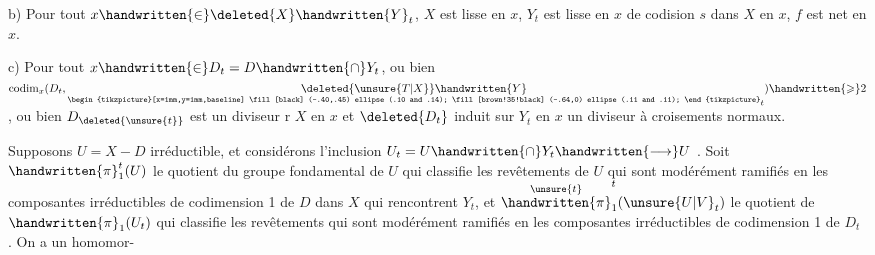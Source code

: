 b) Pour tout $x\handwritten{\in}\deleted{X}\handwritten{Y}_t$, $X$ est lisse en $x$, $Y_t$ est lisse en $x$\handwritten{,} de codision $s$ dans $X$ en $x$, $f$ est net en $x$.

c) Pour tout $x\handwritten{\in}D_t=D\handwritten{\cap}Y_t$, o\deleted{\unsure{\`{}}}u  bien $\operatorname{codim}_x(D_t,\underset{\begin{tikzpicture}[x=1mm,y=1mm,baseline]
\fill[black] (-.40,.45) ellipse (.10 and .14);
\fill[brown!35!black] (-.64,0) ellipse (.11 and .11);
\end{tikzpicture}}{\deleted{\unsure{T|X}}\handwritten{Y}}_t)\handwritten{\geqslant}2$, ou bien $D_{\deleted{\unsure{t}}}$ est un diviseur r $X$ en $x$ et $\deleted{D_t}$ induit sur $Y_t$ en $x$ un diviseur à croisements normaux.

Supposons $U=X-D$ irréductible, et considérons l'inclusion $U_t=U\handwritten{\cap}Y_t\handwritten{\longrightarrow}U$ .  Soit $\handwritten{\pi}_1^t(U)$ le  quotient du groupe fondamental de $U$  qui classifie les revêtements de $U$ qui sont modérément ramifiés en les composantes irréductibles de codimension 1 de $D$ dans $X$ qui rencontrent $Y_t$,  et $\overset{\unsure{t}}{\handwritten{\pi}}_1^t(\unsure{U|V}_t)$ le quotient  de $\handwritten{\pi}_1(U_t)$ qui classifie les revêtements qui sont modérément ramifiés en les composantes irréductibles de codimension 1 de $D_t$ . On a un homomor-

